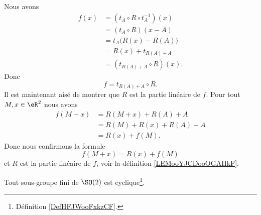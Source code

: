 \begin{example}
	Nous avons
	\begin{subequations}
		\begin{align}
			f(x) & =(t_A\circ R\circ t_A^{-1})(x) \\
			     & =(t_A\circ R)(x-A)             \\
			     & =t_A\big( R(x)-R(A) \big)      \\
			     & =R(x)+t_{R(A)+A}               \\
			     & =(t_{R(A)+A}\circ R)(x).
		\end{align}
	\end{subequations}
	Donc
	\begin{equation}
		f=t_{R(A)+A}\circ R.
	\end{equation}
	Il est maintenant aisé de montrer que \( R\) est la partie linéaire de \( f\). Pour tout \( M,x\in \eR^2\) nous avons
	\begin{subequations}
		\begin{align}
			f(M+x) & =R(M+x)+R(A)+A    \\
			       & =R(M)+R(x)+R(A)+A \\
			       & =R(x)+f(M).
		\end{align}
	\end{subequations}
	Donc nous confirmons la formule
	\begin{equation}
		f(M+x)=R(x)+f(M)
	\end{equation}
	et \( R\) est la partie linéaire de \( f\), voir la définition \ref{LEMooYJCDooOGAHkF}.
\end{example}

\begin{lemma}        \label{LEMooUKEVooAEWvlM}
	Tout sous-groupe fini de \( \SO(2)\) est cyclique\footnote{Définition \ref{DefHFJWooFxkzCF}.}.
\end{lemma}

